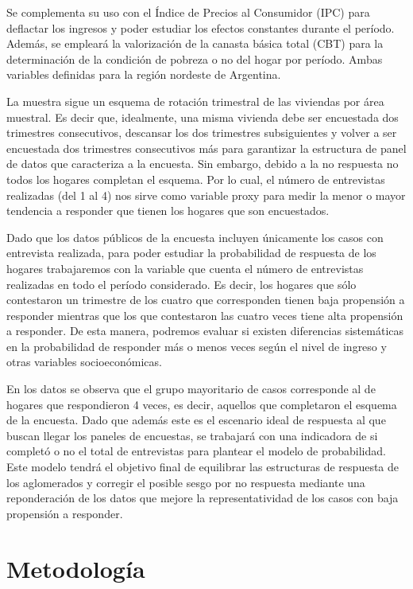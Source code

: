 \documentclass{article}
\begin{document}
Se complementa su uso con el Índice de Precios al Consumidor (IPC) para deflactar los ingresos y poder estudiar los efectos constantes durante el período. Además, se empleará la valorización de la canasta básica total (CBT) para la determinación de la condición de pobreza o no del hogar por período. Ambas variables definidas para la región nordeste de Argentina.

La muestra sigue un esquema de rotación trimestral de las viviendas por área muestral. Es decir que, idealmente, una misma vivienda debe ser encuestada dos trimestres consecutivos, descansar los dos trimestres subsiguientes y volver a ser encuestada dos trimestres consecutivos más para garantizar la estructura de panel de datos que caracteriza a la encuesta. Sin embargo, debido a la no respuesta no todos los hogares completan el esquema. Por lo cual, el número de entrevistas realizadas (del 1 al 4) nos sirve como variable proxy para medir la menor o mayor tendencia a responder que tienen los hogares que son encuestados.

Dado que los datos públicos de la encuesta incluyen únicamente los casos con entrevista realizada, para poder estudiar la probabilidad de respuesta de los hogares trabajaremos con la variable que cuenta el número de entrevistas realizadas en todo el período considerado. Es decir, los hogares que sólo contestaron un trimestre de los cuatro que corresponden tienen baja propensión a responder mientras que los que contestaron las cuatro veces tiene alta propensión a responder. De esta manera, podremos evaluar si existen diferencias sistemáticas en la probabilidad de responder más o menos veces según el nivel de ingreso y otras variables socioeconómicas.

En los datos se observa que el grupo mayoritario de casos corresponde al de hogares que respondieron 4 veces, es decir, aquellos que completaron el esquema de la encuesta. Dado que además este es el escenario ideal de respuesta al que buscan llegar los paneles de encuestas, se trabajará con una indicadora de si completó o no el total de entrevistas para plantear el modelo de probabilidad. Este modelo tendrá el objetivo final de equilibrar las estructuras de respuesta de los aglomerados y corregir el posible sesgo por no respuesta mediante una reponderación de los datos que mejore la representatividad de los casos con baja propensión a responder.


\section{Metodología}
\end{document}
